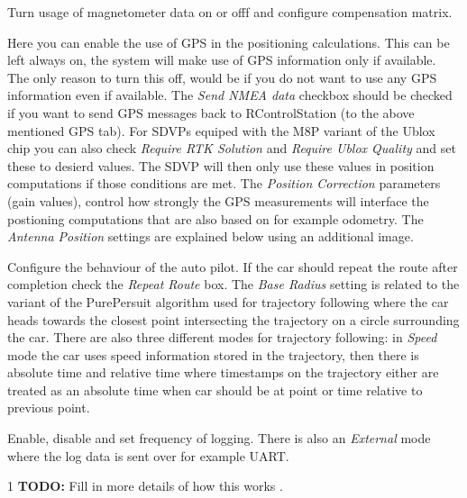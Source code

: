 \documentclass[12pt]{article} %
\def\printtodos{0}
\newcommand{\todo}[1]{
  \if\printtodos1
      {\color{red} \textbf{TODO:} #1}
  \fi}
\begin{document}
\begin{minipage}{0.6\textwidth} %
 Turn usage of magnetometer data on or
offf and configure compensation matrix.

 Here you can enable the use of GPS in the
positioning calculations. This can be left always on, the system will
make use of GPS information only if available. The only reason to turn
this off, would be if you do not want to use any GPS information even
if available. The {\em Send NMEA data} checkbox should be checked if
you want to send GPS messages back to RControlStation (to the above
mentioned GPS tab). For SDVPs equiped with the M8P variant of the
Ublox chip you can also check {\em Require RTK Solution} and {\em
  Require Ublox Quality} and set these to desierd values. The SDVP
will then only use these values in position computations if those
conditions are met.  The {\em Position Correction} parameters (gain
values), control how strongly the GPS measurements will interface the
postioning computations that are also based on for example odometry.
The {\em Antenna Position} settings are explained below using an
additional image.

 Configure the behaviour of the auto
pilot. If the car should repeat the route after completion check the
{\em Repeat Route} box. The {\em Base Radius} setting is related to
the variant of the PurePersuit algorithm used for trajectory following
where the car heads towards the closest point intersecting the
trajectory on a circle surrounding the car. There are also three
different modes for trajectory following: in {\em Speed} mode the car
uses speed information stored in the trajectory, then there is
absolute time and relative time where timestamps on the trajectory
either are treated as an absolute time when car should be at point or
time relative to previous point.

 Enable, disable and set frequency of logging. There is
also an {\em External} mode where the log data is sent over for example UART.
\todo{Fill in more details of how this works}.
\end{minipage}
\end{document}
